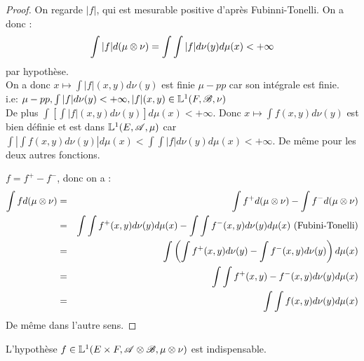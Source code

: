 \begin{proof} %
	On regarde $|f|$, qui est mesurable positive d'après Fubinni-Tonelli. On a donc :
	$$ \int |f| d (\mu \otimes \nu) = \int \int |f| d \nu (y) d \mu (x) < + \infty$$
	par hypothèse. \\
	On a donc $ x   \mapsto \int |f|(x,y) d \nu(y)$ est finie $\mu-pp$ car son intégrale est finie. \\
	i.e: $\mu-pp, \int |f| d \nu(y) < + \infty, |f|(x,y) \in \mathbb{L}^1(F, \mathscr{B}, \nu)$ \\
	De plus $\int \left[ \int |f|(x,y) d    \nu(y)   \right] d \mu(x) < + \infty $.
	Donc $x \mapsto \int f (x,y) d \nu(y)$ est bien définie et est dans $\mathbb{L}^1(E, \mathscr{A}, \mu)$
	car $\int \left| \int f (x,y) d \nu(y) \right| d \mu(x) < \int \int |f| d \nu(y) d \mu(x) < + \infty$.
	De même pour les deux autres fonctions.

	$f = f^+ - f^-$, donc on a :
	\begin{eqnarray*}
		\int f d (\mu \otimes \nu) & = & \int f^+ d (\mu \otimes \nu) - \int f^- d (\mu \otimes \nu) \\
		& = & \int \int f^+(x,y) d \nu(y) d \mu(x) - \int \int f^-(x,y) d \nu(y) d \mu(x) \text{ (Fubini-Tonelli)} \\
		& = & \int \left( \int f^+(x,y) d \nu(y) - \int f^-(x,y) d \nu(y) \right) d \mu(x) \\
		&=& \int \int f^+(x,y) - f^-(x,y) d \nu(y) d \mu(x) \\
		&=& \int \int f(x,y) d \nu(y) d \mu(x)
	\end{eqnarray*}
	De même dans l'autre sens.
\end{proof}

\begin{remarque}
	L'hypothèse $f \in \mathbb{L}^1(E \times F, \mathscr{A} \otimes \mathscr{B}, \mu \otimes \nu)$ est indispensable.
\end{remarque}
